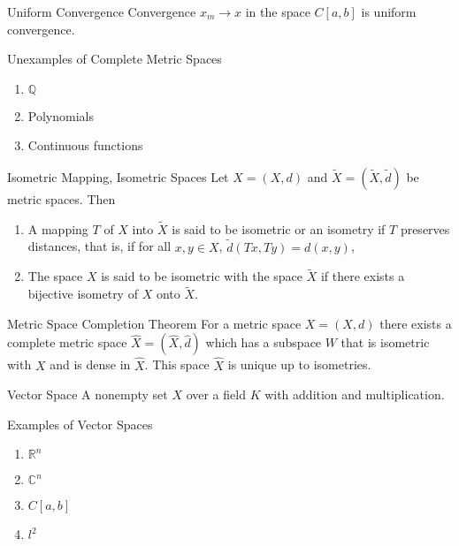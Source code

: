 \documentclass[avery5388,grid,frame]{flashcards}
\begin{document}
\begin{flashcard}[Theorem]{Uniform Convergence}
Convergence $x_m\rightarrow x$ in the space $C[a,b]$ is uniform convergence.
\end{flashcard}

\begin{flashcard}[Example]{Unexamples of Complete Metric Spaces}
\begin{enumerate}
\item $\mathbb{Q}$
\item Polynomials
\item Continuous functions
\end{enumerate}
\end{flashcard}

\begin{flashcard}[Defintion]{Isometric Mapping, Isometric Spaces}
Let $X=(X,d)$ and $\widetilde{X}=(\widetilde{X},\widetilde{d})$ be metric spaces. Then
\begin{enumerate}
\item A mapping $T$ of $X$ into $\widetilde{X}$ is said to be isometric or an isometry if $T$ preserves distances, that is, if for all $x,y\in X$, $\widetilde{d}(Tx,Ty)=d(x,y)$,
\item The space $X$ is said to be isometric with the space $\widetilde{X}$ if there exists a bijective isometry of $X$ onto $\widetilde{X}$.
\end{enumerate}
\end{flashcard}

\begin{flashcard}[Theorem]{Metric Space Completion Theorem}
For a metric space $X=(X,d)$ there exists a complete metric space $\hat{X}=(\hat{X},\hat{d})$ which has a subspace $W$ that is isometric with $X$ and is dense in $\hat{X}$. This space $\hat{X}$ is unique up to isometries.
\end{flashcard}

\begin{flashcard}[Definition]{Vector Space}
A nonempty set $X$ over a field $K$ with addition and multiplication.
\end{flashcard}

\begin{flashcard}[Example]{Examples of Vector Spaces}
\begin{enumerate}
\item $\mathbb{R}^n$
\item $\mathbb{C}^n$
\item $C[a,b]$
\item $l^2$
\end{enumerate}
\end{flashcard}
\end{document}
